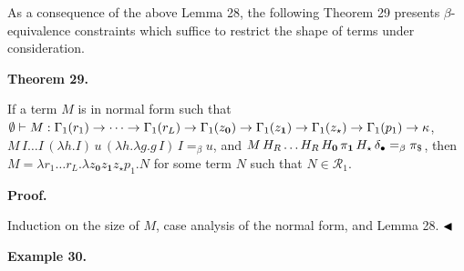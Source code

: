  
 
As a consequence of the above Lemma 28, the following Theorem 29 presents $\beta$-equivalence constraints which suffice to restrict the shape of terms under consideration.\par
 
 
 
\par\medskip\noindent\textbf{Theorem 29.}\par
 
 
If a term $M$ is in normal form such that $\emptyset\vdash M:\Gamma_{1}(r_{1})\to\cdots\to\Gamma_{1}(r_{L})\to\Gamma_{1}(%
z_{\mathbf{0}})\to\Gamma_{1}(z_{\mathbf{1}})\to\Gamma_{1}(z_{\star})\to\Gamma_%
{1}(p_{1})\to\kappa$, $M\,I\ldots I\,(\lambda h.I)\,u\,(\lambda h.\lambda g.g\,I)\,I=_{\beta}u$, and $M\,H_{R}\ldots H_{R}\,H_{\mathbf{0}}\,\pi_{\mathbf{1}}\,H_{\star}\,\delta_{%
\bullet}=_{\beta}\pi_{\$}$, then $M=\lambda r_{1}\ldots r_{L}.\lambda z_{\mathbf{0}}z_{\mathbf{1}}z_{\star}p_{1}.N$ for some term $N$ such that $N\in\mathcal{R}_{1}$.\par
 
 
 
 
 
\par\medskip\noindent\textbf{Proof.}\par
 
 
Induction on the size of $M$, case analysis of the normal form, and Lemma 28. $\hfill\blacktriangleleft$\par
 
 
 
\par\medskip\noindent\textbf{Example 30.}\par
 
 
